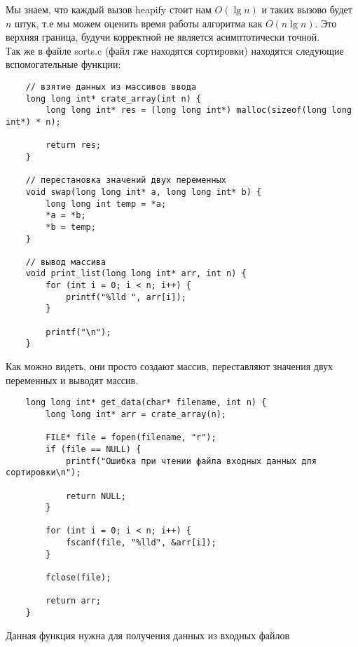 \documentclass[a4paper,12pt,titlepage,finall]{article}
\begin{document}
Мы знаем, что каждый вызов heapify стоит нам $O(\lg n)$ и таких вызово будет
$n$ штук, т.е мы можем оценить время работы алгоритма как $O(n\lg n)$. Это верхняя граница, будучи корректной
не является асимптотически точной.
\\

Так же в файле sorts.c (файл гже находятся сортировки) находятся следующие вспомогательные функции:

\begin{verbatim}
    // взятие данных из массивов ввода
    long long int* crate_array(int n) {
        long long int* res = (long long int*) malloc(sizeof(long long int*) * n);

        return res;
    }

    // перестановка значений двух переменных
    void swap(long long int* a, long long int* b) {
        long long int temp = *a;
        *a = *b;
        *b = temp;
    }

    // вывод массива
    void print_list(long long int* arr, int n) {
        for (int i = 0; i < n; i++) {
            printf("%lld ", arr[i]);
        }

        printf("\n");
    }
\end{verbatim}

Как можно видеть, они просто создают массив, переставляют значения двух переменных и выводят массив. \\

\begin{verbatim}
    long long int* get_data(char* filename, int n) {
        long long int* arr = crate_array(n);
    
        FILE* file = fopen(filename, "r");
        if (file == NULL) {
            printf("Ошибка при чтении файла входных данных для сортировки\n");
    
            return NULL;
        }
    
        for (int i = 0; i < n; i++) {
            fscanf(file, "%lld", &arr[i]);
        }
    
        fclose(file);
    
        return arr;
    }
\end{verbatim}

Данная функция нужна для получения данных из входных файлов
\end{document}
